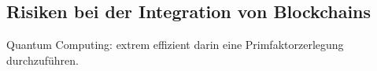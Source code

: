 \subsection{Risiken bei der Integration von Blockchains}
\cite[p.~17]{pirafelnerblockchaintechnologie}


Quantum Computing:
extrem effizient darin eine Primfaktorzerlegung durchzuführen.

